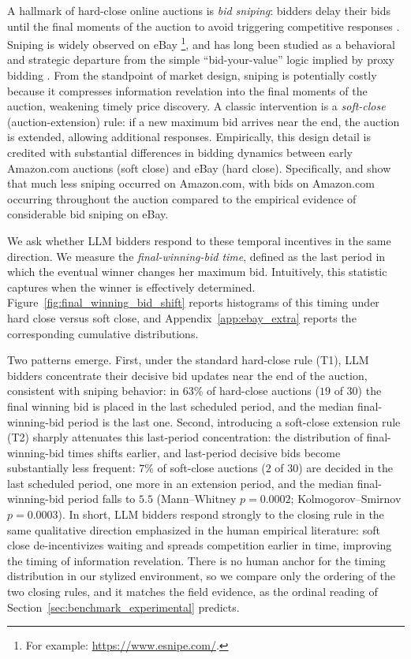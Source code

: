 \documentclass[acmsmall,screen,review]{acmart}
\begin{document}
A hallmark of hard-close online auctions is \emph{bid sniping}: bidders delay their bids until the final moments of the auction to avoid triggering competitive responses . Sniping is widely observed on eBay \footnote{For example: \url{https://www.esnipe.com/}.}, and has long been studied as a behavioral and strategic departure from the simple ``bid-your-value'' logic implied by proxy bidding \citep{roth2002last}.
From the standpoint of market design, sniping is potentially costly because it compresses information revelation into the final moments of the auction, weakening timely price discovery.
A classic intervention is a \emph{soft-close} (auction-extension) rule: if a new maximum bid arrives near the end, the auction is extended, allowing additional responses. Empirically, this design detail is credited with substantial differences in bidding dynamics between early Amazon.com auctions (soft close) and eBay (hard close).
Specifically, \citet{roth2002last} and \citet{ockenfels2006late} show that much less sniping occurred on Amazon.com, with bids on Amazon.com occurring throughout the auction compared to the empirical evidence of considerable bid
sniping on eBay.


We ask whether LLM bidders respond to these temporal incentives in the same direction. We measure the \emph{final-winning-bid time}, defined as the last period in which the eventual winner changes her maximum bid. Intuitively, this statistic captures when the winner is effectively determined. Figure~\ref{fig:final_winning_bid_shift} reports histograms of this timing under hard close versus soft close, and Appendix~\ref{app:ebay_extra} reports the corresponding cumulative distributions.

Two patterns emerge. First, under the standard hard-close rule (T1), LLM bidders concentrate their decisive bid updates near the end of the auction, consistent with sniping behavior: in $63\%$ of hard-close auctions ($19$ of $30$) the final winning bid is placed in the last scheduled period, and the median final-winning-bid period is the last one. Second, introducing a soft-close extension rule (T2) sharply attenuates this last-period concentration: the distribution of final-winning-bid times shifts earlier, and last-period decisive bids become substantially less frequent: $7\%$ of soft-close auctions ($2$ of $30$) are decided in the last scheduled period, one more in an extension period, and the median final-winning-bid period falls to $5.5$ (Mann--Whitney $p=0.0002$; Kolmogorov--Smirnov $p=0.0003$). In short, LLM bidders respond strongly to the closing rule in the same qualitative direction emphasized in the human empirical literature: soft close de-incentivizes waiting and spreads competition earlier in time, improving the timing of information revelation. There is no human anchor for the timing distribution in our stylized environment, so we compare only the ordering of the two closing rules, and it matches the field evidence, as the ordinal reading of Section~\ref{sec:benchmark_experimental} predicts.
\end{document}

